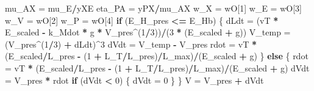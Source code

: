 \documentclass[]{article}
\newenvironment{Shaded}{\begin{snugshade}}{\end{snugshade}}
\newcommand{\DecValTok}[1]{\textcolor[rgb]{0.00,0.00,0.81}{#1}}
\newcommand{\StringTok}[1]{\textcolor[rgb]{0.31,0.60,0.02}{#1}}
\newcommand{\ControlFlowTok}[1]{\textcolor[rgb]{0.13,0.29,0.53}{\textbf{#1}}}
\newcommand{\OperatorTok}[1]{\textcolor[rgb]{0.81,0.36,0.00}{\textbf{#1}}}
\newcommand{\NormalTok}[1]{#1}
\begin{document}
\begin{Shaded}
\begin{Highlighting}[]
{{{\NormalTok{    mu_AX =}\StringTok{ }\NormalTok{mu_E}\OperatorTok{/}\NormalTok{yXE}
\NormalTok{    eta_PA =}\StringTok{ }\NormalTok{yPX}\OperatorTok{/}\NormalTok{mu_AX}
\NormalTok{    w_X =}\StringTok{ }\NormalTok{wO[}\DecValTok{1}\NormalTok{]}
\NormalTok{    w_E =}\StringTok{ }\NormalTok{wO[}\DecValTok{3}\NormalTok{]}
\NormalTok{    w_V =}\StringTok{ }\NormalTok{wO[}\DecValTok{2}\NormalTok{]}
\NormalTok{    w_P =}\StringTok{ }\NormalTok{wO[}\DecValTok{4}\NormalTok{]}
    \ControlFlowTok{if}\NormalTok{ (E_H_pres }\OperatorTok{<=}\StringTok{ }\NormalTok{E_Hb) \{}
\NormalTok{        dLdt =}\StringTok{ }\NormalTok{(vT }\OperatorTok{*}\StringTok{ }\NormalTok{E_scaled }\OperatorTok{-}\StringTok{ }\NormalTok{k_Mdot }\OperatorTok{*}\StringTok{ }\NormalTok{g }\OperatorTok{*}\StringTok{ }\NormalTok{V_pres}\OperatorTok{^}\NormalTok{(}\DecValTok{1}\OperatorTok{/}\DecValTok{3}\NormalTok{))}\OperatorTok{/}\NormalTok{(}\DecValTok{3} \OperatorTok{*}\StringTok{ }
\StringTok{            }\NormalTok{(E_scaled }\OperatorTok{+}\StringTok{ }\NormalTok{g))}
\NormalTok{        V_temp =}\StringTok{ }\NormalTok{(V_pres}\OperatorTok{^}\NormalTok{(}\DecValTok{1}\OperatorTok{/}\DecValTok{3}\NormalTok{) }\OperatorTok{+}\StringTok{ }\NormalTok{dLdt)}\OperatorTok{^}\DecValTok{3}
\NormalTok{        dVdt =}\StringTok{ }\NormalTok{V_temp }\OperatorTok{-}\StringTok{ }\NormalTok{V_pres}
\NormalTok{        rdot =}\StringTok{ }\NormalTok{vT }\OperatorTok{*}\StringTok{ }\NormalTok{(E_scaled}\OperatorTok{/}\NormalTok{L_pres }\OperatorTok{-}\StringTok{ }\NormalTok{(}\DecValTok{1} \OperatorTok{+}\StringTok{ }\NormalTok{L_T}\OperatorTok{/}\NormalTok{L_pres)}\OperatorTok{/}\NormalTok{L_max)}\OperatorTok{/}\NormalTok{(E_scaled }\OperatorTok{+}\StringTok{ }
\StringTok{            }\NormalTok{g)}
\NormalTok{    \}}
    \ControlFlowTok{else}\NormalTok{ \{}
\NormalTok{        rdot =}\StringTok{ }\NormalTok{vT }\OperatorTok{*}\StringTok{ }\NormalTok{(E_scaled}\OperatorTok{/}\NormalTok{L_pres }\OperatorTok{-}\StringTok{ }\NormalTok{(}\DecValTok{1} \OperatorTok{+}\StringTok{ }\NormalTok{L_T}\OperatorTok{/}\NormalTok{L_pres)}\OperatorTok{/}\NormalTok{L_max)}\OperatorTok{/}\NormalTok{(E_scaled }\OperatorTok{+}\StringTok{ }
\StringTok{            }\NormalTok{g)}
\NormalTok{        dVdt =}\StringTok{ }\NormalTok{V_pres }\OperatorTok{*}\StringTok{ }\NormalTok{rdot}
        \ControlFlowTok{if}\NormalTok{ (dVdt }\OperatorTok{<}\StringTok{ }\DecValTok{0}\NormalTok{) \{}
\NormalTok{            dVdt =}\StringTok{ }\DecValTok{0}
\NormalTok{        \}}
\NormalTok{    \}}
\NormalTok{    V =}\StringTok{ }\NormalTok{V_pres }\OperatorTok{+}\StringTok{ }\NormalTok{dVdt}
}}}
\end{Highlighting}
\end{Shaded}
\end{document}
